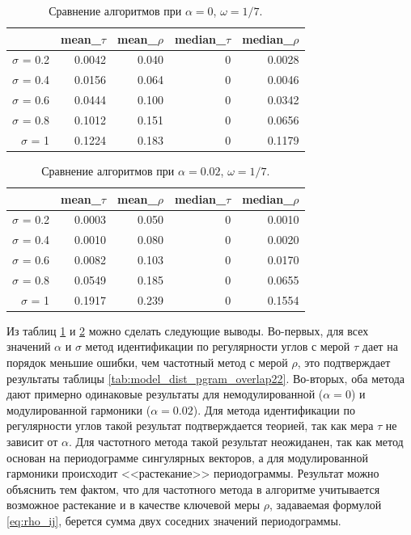 \documentclass[specialist,
               substylefile = spbu.rtx,
               subf,href,colorlinks=true, 12pt]{disser}
\begin{document}
\begin{table}[hhh!]
\centering
\caption{Сравнение алгоритмов при $\alpha = 0$, $\omega = 1/7$.}
\begin{tabular}{rrrrr}
  \hline
 & mean\_$\tau$ & mean\_$\rho$ & median\_$\tau$ & median\_$\rho$ \\
  \hline
$\sigma$ = 0.2 & 0.0042 & 0.040 & 0 & 0.0028 \\ 
  $\sigma$ = 0.4 & 0.0156 & 0.064 & 0 & 0.0046 \\ 
  $\sigma$ = 0.6 & 0.0444 & 0.100 & 0 & 0.0342 \\ 
  $\sigma$ = 0.8 & 0.1012 & 0.151 & 0 & 0.0656 \\ 
  $\sigma$ = 1 & 0.1224 & 0.183 & 0 & 0.1179 \\ 
   \hline
\end{tabular}
\label{tab:comp_tau1_pgram}
\end{table}

\begin{table}[hhh!]
\centering
\caption{Сравнение алгоритмов при $\alpha = 0.02$, $\omega = 1/7$.}
\begin{tabular}{rrrrr}
  \hline
 & mean\_$\tau$ & mean\_$\rho$ & median\_$\tau$ & median\_$\rho$ \\
  \hline
$\sigma$ = 0.2 & 0.0003 & 0.050 & 0 & 0.0010 \\ 
  $\sigma$ = 0.4 & 0.0010 & 0.080 & 0 & 0.0020 \\ 
  $\sigma$ = 0.6 & 0.0082 & 0.103 & 0 & 0.0170 \\ 
  $\sigma$ = 0.8 & 0.0549 & 0.185 & 0 & 0.0655 \\ 
  $\sigma$ = 1 & 0.1917 & 0.239 & 0 & 0.1554 \\ 
   \hline
\end{tabular}
\label{tab:comp_tau1_pgram2}
\end{table}

Из таблиц \ref{tab:comp_tau1_pgram} и \ref{tab:comp_tau1_pgram2} можно сделать следующие выводы. Во-первых, для всех значений $\alpha$ и $\sigma$ метод идентификации по регулярности углов с мерой $\tau$ дает на порядок меньшие ошибки, чем частотный метод с мерой $\rho$, это подтверждает результаты таблицы \ref{tab:model_dist_pgram_overlap22}. Во-вторых, оба метода дают примерно одинаковые результаты для немодулированной  ($\alpha = 0$) и модулированной гармоники ($\alpha=0.02$). Для метода идентификации по регулярности углов такой результат подтверждается теорией, так как мера $\tau$ не зависит от $\alpha$. Для частотного метода такой результат неожиданен, так как метод основан на периодограмме сингулярных векторов, а для модулированной гармоники происходит <<растекание>> периодограммы. Результат можно объяснить тем фактом, что для частотного метода в алгоритме учитывается возможное растекание и 
в качестве ключевой меры $\rho$, задаваемая формулой \eqref{eq:rho_ij}, берется сумма двух соседних значений периодограммы.
\end{document}
